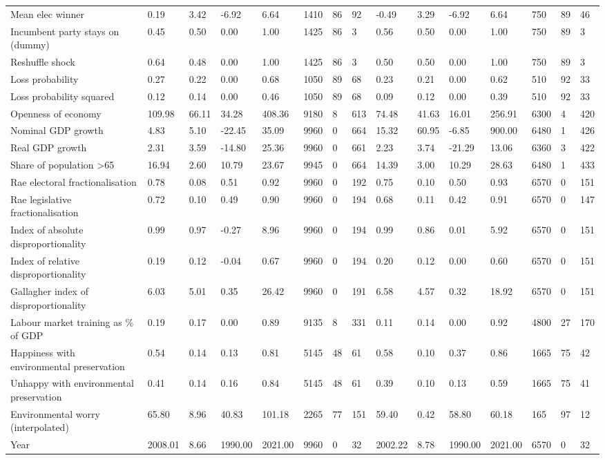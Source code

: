 \begin{longtable}{lllllllllllllll}
Mean elec winner & 0.19 & 3.42 & -6.92 & 6.64 & 1410 & 86 & 92 & -0.49 & 3.29 & -6.92 & 6.64 & 750 & 89 & 46\\
Incumbent party stays on (dummy) & 0.45 & 0.50 & 0.00 & 1.00 & 1425 & 86 & 3 & 0.56 & 0.50 & 0.00 & 1.00 & 750 & 89 & 3\\
\addlinespace
Reshuffle shock & 0.64 & 0.48 & 0.00 & 1.00 & 1425 & 86 & 3 & 0.50 & 0.50 & 0.00 & 1.00 & 750 & 89 & 3\\
Loss probability & 0.27 & 0.22 & 0.00 & 0.68 & 1050 & 89 & 68 & 0.23 & 0.21 & 0.00 & 0.62 & 510 & 92 & 33\\
Loss probability squared & 0.12 & 0.14 & 0.00 & 0.46 & 1050 & 89 & 68 & 0.09 & 0.12 & 0.00 & 0.39 & 510 & 92 & 33\\
Openness of economy & 109.98 & 66.11 & 34.28 & 408.36 & 9180 & 8 & 613 & 74.48 & 41.63 & 16.01 & 256.91 & 6300 & 4 & 420\\
Nominal GDP growth & 4.83 & 5.10 & -22.45 & 35.09 & 9960 & 0 & 664 & 15.32 & 60.95 & -6.85 & 900.00 & 6480 & 1 & 426\\
\addlinespace
Real GDP growth & 2.31 & 3.59 & -14.80 & 25.36 & 9960 & 0 & 661 & 2.23 & 3.74 & -21.29 & 13.06 & 6360 & 3 & 422\\
Share of population >65 & 16.94 & 2.60 & 10.79 & 23.67 & 9945 & 0 & 664 & 14.39 & 3.00 & 10.29 & 28.63 & 6480 & 1 & 433\\
Rae electoral fractionalisation & 0.78 & 0.08 & 0.51 & 0.92 & 9960 & 0 & 192 & 0.75 & 0.10 & 0.50 & 0.93 & 6570 & 0 & 151\\
Rae legislative fractionalisation & 0.72 & 0.10 & 0.49 & 0.90 & 9960 & 0 & 194 & 0.68 & 0.11 & 0.42 & 0.91 & 6570 & 0 & 147\\
Index of absolute disproportionality & 0.99 & 0.97 & -0.27 & 8.96 & 9960 & 0 & 194 & 0.99 & 0.86 & 0.01 & 5.92 & 6570 & 0 & 151\\
\addlinespace
Index of relative disproportionality & 0.19 & 0.12 & -0.04 & 0.67 & 9960 & 0 & 194 & 0.20 & 0.12 & 0.00 & 0.60 & 6570 & 0 & 151\\
Gallagher index of disproportionality & 6.03 & 5.01 & 0.35 & 26.42 & 9960 & 0 & 191 & 6.58 & 4.57 & 0.32 & 18.92 & 6570 & 0 & 151\\
Labour market training as \% of GDP & 0.19 & 0.17 & 0.00 & 0.89 & 9135 & 8 & 331 & 0.11 & 0.14 & 0.00 & 0.92 & 4800 & 27 & 170\\
Happiness with environmental preservation & 0.54 & 0.14 & 0.13 & 0.81 & 5145 & 48 & 61 & 0.58 & 0.10 & 0.37 & 0.86 & 1665 & 75 & 42\\
Unhappy with environmental preservation & 0.41 & 0.14 & 0.16 & 0.84 & 5145 & 48 & 61 & 0.39 & 0.10 & 0.13 & 0.59 & 1665 & 75 & 41\\
\addlinespace
Environmental worry (interpolated) & 65.80 & 8.96 & 40.83 & 101.18 & 2265 & 77 & 151 & 59.40 & 0.42 & 58.80 & 60.18 & 165 & 97 & 12\\
Year & 2008.01 & 8.66 & 1990.00 & 2021.00 & 9960 & 0 & 32 & 2002.22 & 8.78 & 1990.00 & 2021.00 & 6570 & 0 & 32\\
\bottomrule
\end{longtable}
